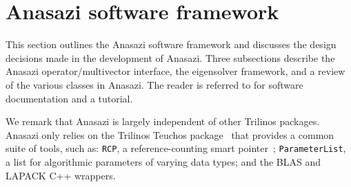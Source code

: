 \documentclass[acmtoms]{acmtrans2m}
\newcounter{algorithm}
\begin{document}



\section{Anasazi software framework}
\label{sec:framework}

This section outlines the Anasazi software framework and discusses 
the design decisions made in the development of Anasazi. Three
subsections describe the Anasazi operator/multivector interface, the
eigensolver framework, and a review of the various classes in
Anasazi. The reader is referred to
\cite{Trilinos:anasazi,Trilinos-Tutorial} for software documentation
and a tutorial.

We remark that Anasazi is largely independent of other Trilinos packages. 
Anasazi only relies on the Trilinos Teuchos package~\cite{Trilinos:Teuchos}
that provides a common suite of tools, such as: \texttt{RCP},
a reference-counting smart pointer~\cite{Detlefs:1992:GCR,Teuchos-RCP};
\texttt{ParameterList}, a list for algorithmic parameters of
varying data types; and the BLAS
\cite{Lawson:1979:BLA,Blackford:2002:USB} and LAPACK \cite{abbd:95} C++ wrappers.
\end{document}
